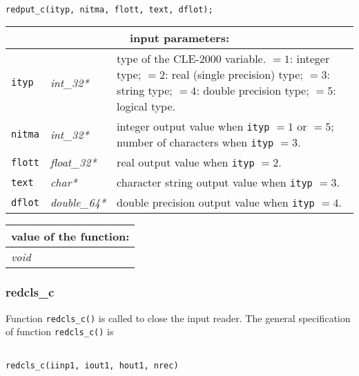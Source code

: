 \begin{verbatim}

redput_c(ityp, nitma, flott, text, dflot);
\end{verbatim}

\vskip 0.8cm

\noindent
\begin{tabular}{|p{1.5cm}|p{2cm}|p{11cm}|}
\hline
\multicolumn{3}{|c|}{\bf input parameters:} \\
\hline
{\tt ityp} & {\it int\_32*} & type of the CLE-2000 variable. $=1$: integer type;
$=2$: real (single precision) type;
$=3$: string type;
$=4$: double precision type;
$=5$: logical type.\\
\hline
{\tt nitma} & {\it int\_32*} & integer output value when {\tt ityp} $= 1$ or $= 5$;  number of characters when {\tt ityp} $= 3$. \\
\hline
{\tt flott} & {\it float\_32*} &  real output value when {\tt ityp} $= 2$. \\
\hline
{\tt text} & {\it char*} & character string output value when {\tt ityp} $= 3$.  \\
\hline
{\tt dflot} & {\it double\_64*} & double precision output value when {\tt ityp} $= 4$.  \\
\hline
\end{tabular}

\vskip 0.4cm

\noindent
\begin{tabular}{|p{4.0cm}|p{11cm}|}
\hline
\multicolumn{2}{|c|}{\bf value of the function:} \\
\hline
{\it void} &  \\
\hline
\end{tabular}

\subsubsection{redcls\_c}

Function {\tt redcls\_c()} is called to close the input reader.
The general specification of function {\tt redcls\_c()} is

\begin{verbatim}

redcls_c(iinp1, iout1, hout1, nrec)
\end{verbatim}

\vskip 0.8cm

